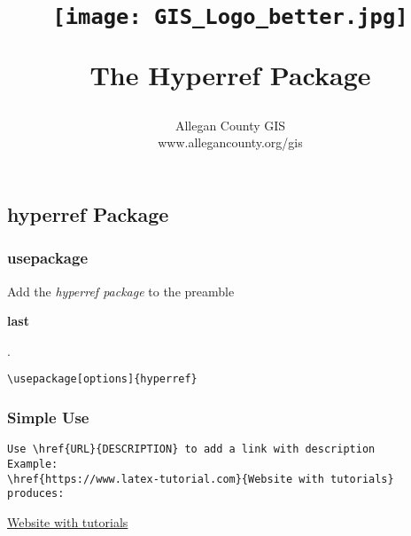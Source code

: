 \documentclass[class=book , crop=false]{standalone}
\title{ %
\HRule %
\\[.4cm] %
\begin{figure}[H] %
\begin{center}	%
\texttt{[image: GIS\_Logo\_better.jpg]}
\end{center}
\end{figure}
\Huge \bfseries The Hyperref Package %
\HRule \\[.4cm] %
}  %
\author{\Large Allegan County GIS \\\Large www.allegancounty.org/gis} %
\begin{document}

\ifstandalone
\maketitle %
\tableofcontents %
\clearpage
\fi

\subsection{hyperref Package}
\medskip 
\subsubsection{\Large usepackage}

Add the \textit{hyperref package} to the preamble\begin{large}\textbf{ last}\end{large}.	

\begin{verbatim}\usepackage[options]{hyperref}\end{verbatim}

\subsubsection{\Large Simple Use}
\begin{verbatim}Use \href{URL}{DESCRIPTION} to add a link with description
Example:
\href{https://www.latex-tutorial.com}{Website with tutorials}
produces:
\end{verbatim}
\href{https://www.latex-tutorial.com}{Website with tutorials}

	
\end{document}
